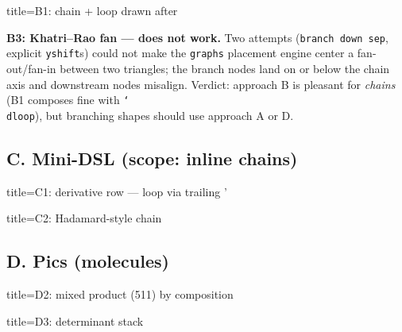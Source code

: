 \documentclass[11pt]{article}
\begin{document}
\begin{tcblisting}{title=B1: chain + loop drawn after}
\end{tcblisting}

\textbf{B3: Khatri--Rao fan --- does not work.} Two attempts (\texttt{branch
down sep}, explicit \texttt{yshift}s) could not make the \texttt{graphs}
placement engine center a fan-out/fan-in between two triangles; the branch
nodes land on or below the chain axis and downstream nodes misalign. Verdict:
approach B is pleasant for \emph{chains} (B1 composes fine with \texttt{\char`\\dloop}),
but branching shapes should use approach A or D.

\subsection*{C. Mini-DSL (scope: inline chains)}

\begin{tcblisting}{title=C1: derivative row --- loop via trailing '}
\end{tcblisting}

\begin{tcblisting}{title=C2: Hadamard-style chain}
\end{tcblisting}

\subsection*{D. Pics (molecules)}

\begin{tcblisting}{title=D2: mixed product (511) by composition}
\end{tcblisting}

\begin{tcblisting}{title=D3: determinant stack}
\end{tcblisting}
\end{document}
